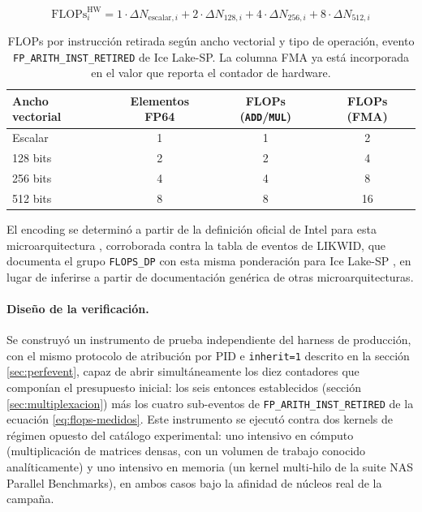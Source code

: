 \documentclass[12pt,oneside,spanish]{book}
\begin{document}
\begin{equation}
\text{FLOPs}_{i}^{\text{HW}} = 1 \cdot \Delta N_{\text{escalar},i} + 2 \cdot \Delta N_{128,i} + 4 \cdot \Delta N_{256,i} + 8 \cdot \Delta N_{512,i}
\label{eq:flops-medidos}
\end{equation}

\begin{table}[h]
\centering
\caption[FLOPs por instrucción retirada]{FLOPs por instrucción retirada según ancho vectorial y tipo de operación, evento \texttt{FP\_ARITH\_INST\_RETIRED} de Ice Lake-SP. La columna FMA ya está incorporada en el valor que reporta el contador de hardware.}
\label{tab:fma-pesos}
\begin{tabular}{@{}lccc@{}}
\toprule
Ancho vectorial & Elementos FP64 & FLOPs (\texttt{ADD}/\texttt{MUL}) & FLOPs (FMA) \\
\midrule
Escalar   & 1 & 1 & 2 \\
128 bits  & 2 & 2 & 4 \\
256 bits  & 4 & 4 & 8 \\
512 bits  & 8 & 8 & 16 \\
\bottomrule
\end{tabular}
\end{table}

El encoding se determinó a partir de la definición oficial de Intel para esta microarquitectura \cite{IntelPerfmon2026}, corroborada contra la tabla de eventos de LIKWID, que documenta el grupo \texttt{FLOPS\_DP} con esta misma ponderación para Ice Lake-SP \cite{Treibig2010}, en lugar de inferirse a partir de documentación genérica de otras microarquitecturas.

\paragraph{Diseño de la verificación.} Se construyó un instrumento de prueba independiente del harness de producción, con el mismo protocolo de atribución por PID e \texttt{inherit=1} descrito en la sección \ref{sec:perfevent}, capaz de abrir simultáneamente los diez contadores que componían el presupuesto inicial: los seis entonces establecidos (sección \ref{sec:multiplexacion}) más los cuatro sub-eventos de \texttt{FP\_ARITH\_INST\_RETIRED} de la ecuación \eqref{eq:flops-medidos}. Este instrumento se ejecutó contra dos kernels de régimen opuesto del catálogo experimental: uno intensivo en cómputo (multiplicación de matrices densas, con un volumen de trabajo conocido analíticamente) y uno intensivo en memoria (un kernel multi-hilo de la suite NAS Parallel Benchmarks), en ambos casos bajo la afinidad de núcleos real de la campaña.
\end{document}
